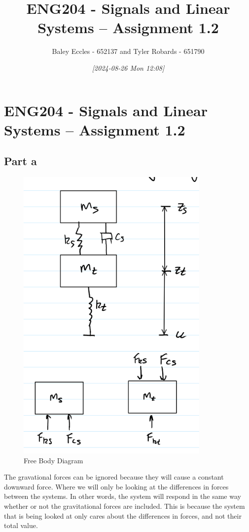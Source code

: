 \documentclass[11pt]{article}
\author{Baley Eccles - 652137 and Tyler Robards - 651790}
\date{\textit{{[}2024-08-26 Mon 12:08]}}
\title{ENG204 - Signals and Linear Systems – Assignment 1.2}
\begin{document}
\maketitle
\tableofcontents

\section{ENG204 - Signals and Linear Systems – Assignment 1.2}
\label{sec:org831f92d}
\subsection{Part a}
\label{sec:org72d9136}
\begin{figure}[H]
    \centering
    \includegraphics[width=0.7\linewidth]{ENG204-FBD.png}
    \caption{Free Body Diagram}
    \label{fig:FBD}
\end{figure}


The gravational forces can be ignored because they will cause a constant downward force. Where we will only be looking at the differences in forces between the systems. In other words, the system will respond in the same way whether or not the gravitational forces are included. This is because the system that is being looked at only cares about the differences in forces, and not their total value.
\end{document}
